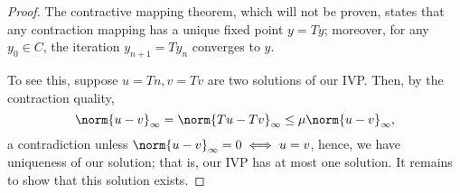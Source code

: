 \begin{proof}
    The contractive mapping theorem, which will not be proven, states that any contraction mapping has a unique fixed point $y = Ty$; moreover, for any $y_0 \in C$, the iteration $y_{n+1} = T y_n$ converges to $y$.

    To see this, suppose $u = Tn, v = Tv$ are two solutions of our IVP. Then, by the contraction quality, \[
    \norm{u-v}_\infty = \norm{Tu - Tv}_\infty \leq \mu \norm{u-v}_\infty ,   
    \]
    a contradiction unless $\norm{u-v}_\infty = 0 \iff u = v$, hence, we have uniqueness of our solution; that is, our IVP has at most one solution. It remains to show that this solution exists.
\end{proof}